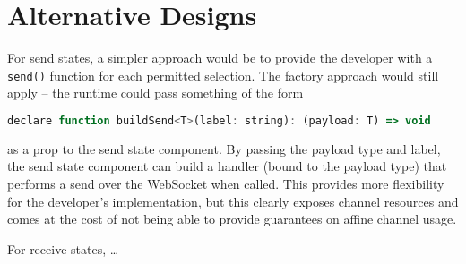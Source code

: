 \section{Alternative Designs}

For send states, a simpler approach would be
to provide the developer with a \texttt{send()} function 
for each permitted selection.
The factory approach would still apply -- the runtime could pass something
of the form

\begin{lstlisting}[language=javascript, numbers=none]
declare function buildSend<T>(label: string): (payload: T) => void
\end{lstlisting}

as a prop to the send state component.
By passing the payload type and label, the send state component
can build a handler (bound to the payload type) that performs a
send over the WebSocket when called.
This provides more flexibility for the developer's implementation,
but this clearly exposes channel resources and 
comes at the cost of not being able to provide guarantees
on affine channel usage.

For receive states, \dots

%
